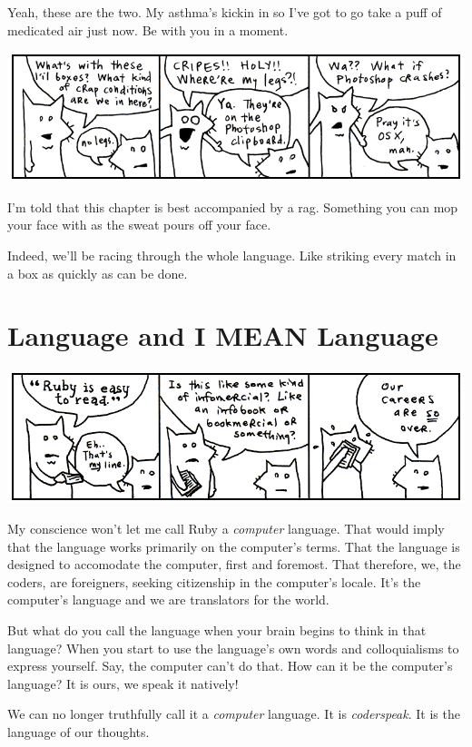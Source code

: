 \documentclass[10pt,twoside]{report}
\begin{document}
Yeah, these are the two.  My asthma's kickin in so I've got to go take
a puff of medicated air just now.  Be with you in a moment.

	\includegraphics[width=1.0\textwidth]{cache/6.png}

I'm told that this chapter is best accompanied by a rag.  Something
you can mop your face with as the sweat pours off your face.

Indeed, we'll be racing through the whole language.  Like striking
every match in a box as quickly as can be done.


\section{Language and I MEAN Language}

	\includegraphics[width=1.0\textwidth]{cache/7.png}

My conscience won't let me call Ruby a {\em computer} language.  That
would imply that the language works primarily on the computer's terms.
That the language is designed to accomodate the computer, first and
foremost.  That therefore, we, the coders, are foreigners, seeking
citizenship in the computer's locale.  It's the computer's language
and we are translators for the world.

But what do you call the language when your brain begins to think in
that language?  When you start to use the language's own words and
colloquialisms to express yourself.  Say, the computer can't do that.
How can it be the computer's language?  It is ours, we speak it
natively!

We can no longer truthfully call it a {\em computer} language.  It is
{\em coderspeak}.  It is the language of our thoughts.
\end{document}
